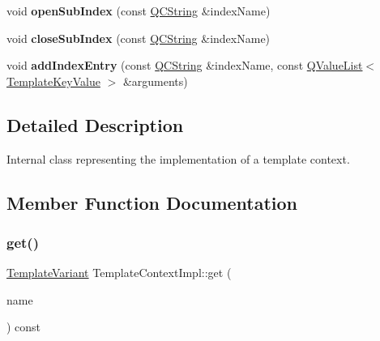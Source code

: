 \begin{DoxyCompactItemize}
\item 
\mbox{\label{class_template_context_impl_abbc758144c9e9485547d59e8b6911c9d}} 
void {\bfseries open\+Sub\+Index} (const \mbox{\hyperlink{class_q_c_string}{Q\+C\+String}} \&index\+Name)
\item 
\mbox{\label{class_template_context_impl_afd3109a0f91006ab2a730e6af55f2b97}} 
void {\bfseries close\+Sub\+Index} (const \mbox{\hyperlink{class_q_c_string}{Q\+C\+String}} \&index\+Name)
\item 
\mbox{\label{class_template_context_impl_ae79b62ed2da2f5dcaf52b691deacec28}} 
void {\bfseries add\+Index\+Entry} (const \mbox{\hyperlink{class_q_c_string}{Q\+C\+String}} \&index\+Name, const \mbox{\hyperlink{class_q_value_list}{Q\+Value\+List}}$<$ \mbox{\hyperlink{struct_template_key_value}{Template\+Key\+Value}} $>$ \&arguments)
\end{DoxyCompactItemize}


\subsection{Detailed Description}
Internal class representing the implementation of a template context. 

\subsection{Member Function Documentation}
\mbox{\label{class_template_context_impl_a0609e62251b223bbd14851738fa10727}} 
\subsubsection{\texorpdfstring{get()}{get()}}
{\footnotesize\ttfamily \mbox{\hyperlink{class_template_variant}{Template\+Variant}} Template\+Context\+Impl\+::get (\begin{DoxyParamCaption}\item[{const \mbox{\hyperlink{class_q_c_string}{Q\+C\+String}} \&}]{name }\end{DoxyParamCaption}) const\hspace{0.3cm}{\ttfamily [virtual]}}


